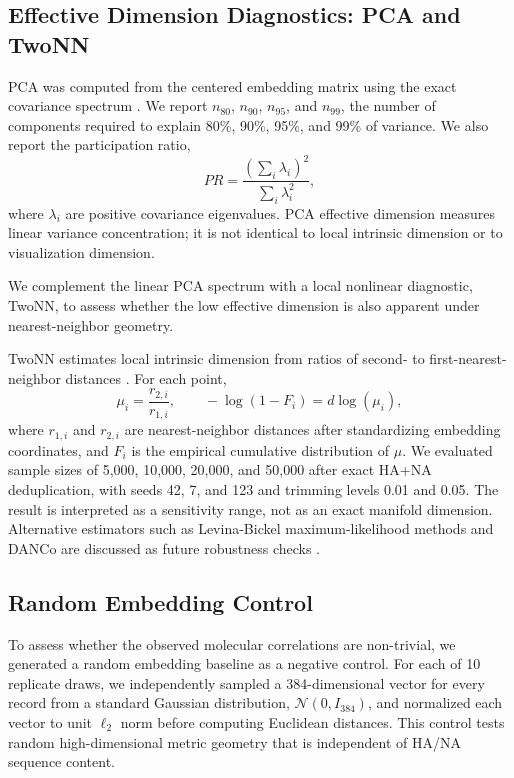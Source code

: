 \documentclass[11pt]{article}
\begin{document}
\subsection{Effective Dimension Diagnostics: PCA and TwoNN}

PCA was computed from the centered embedding matrix using the exact covariance spectrum \cite{jolliffe2002pca,jolliffe2016pca}. We report $n_{80}$, $n_{90}$, $n_{95}$, and $n_{99}$, the number of components required to explain 80\%, 90\%, 95\%, and 99\% of variance. We also report the participation ratio,
\[
PR=\frac{(\sum_i\lambda_i)^2}{\sum_i\lambda_i^2},
\]
where $\lambda_i$ are positive covariance eigenvalues. PCA effective dimension measures linear variance concentration; it is not identical to local intrinsic dimension or to visualization dimension.

We complement the linear PCA spectrum with a local nonlinear diagnostic, TwoNN, to assess whether the low effective dimension is also apparent under nearest-neighbor geometry.

TwoNN estimates local intrinsic dimension from ratios of second- to first-nearest-neighbor distances \cite{facco2017intrinsic}. For each point,
\[
\mu_i=\frac{r_{2,i}}{r_{1,i}},
\qquad
-\log(1-F_i)=d\log(\mu_i),
\]
where $r_{1,i}$ and $r_{2,i}$ are nearest-neighbor distances after standardizing embedding coordinates, and $F_i$ is the empirical cumulative distribution of $\mu$. We evaluated sample sizes of 5,000, 10,000, 20,000, and 50,000 after exact HA+NA deduplication, with seeds 42, 7, and 123 and trimming levels 0.01 and 0.05. The result is interpreted as a sensitivity range, not as an exact manifold dimension. Alternative estimators such as Levina-Bickel maximum-likelihood methods and DANCo are discussed as future robustness checks \cite{levina2005maximum,ceruti2014danco}.

\subsection{Random Embedding Control}

To assess whether the observed molecular correlations are non-trivial, we generated a random embedding baseline as a negative control. For each of 10 replicate draws, we independently sampled a 384-dimensional vector for every record from a standard Gaussian distribution, $\mathcal{N}(0,I_{384})$, and normalized each vector to unit $\ell_2$ norm before computing Euclidean distances. This control tests random high-dimensional metric geometry that is independent of HA/NA sequence content.
\end{document}
